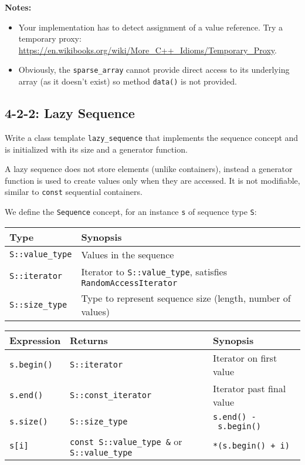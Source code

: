 \documentclass[]{article}
\providecommand{\tightlist}{%
  \setlength{\itemsep}{0pt}\setlength{\parskip}{0pt}}
\begin{document}
\textbf{Notes:}

\begin{itemize}
\tightlist
\item
  Your implementation has to detect assignment of a value reference. Try
  a temporary proxy:
  \url{https://en.wikibooks.org/wiki/More_C++_Idioms/Temporary_Proxy}.
\item
  Obviously, the \texttt{sparse\_array} cannot provide direct access to
  its underlying array (as it doesn't exist) so method \texttt{data()}
  is not provided.
\end{itemize}

\subsection{4-2-2: Lazy Sequence}\label{lazy-sequence}

Write a class template \texttt{lazy\_sequence} that implements the
sequence concept and is initialized with its size and a generator
function.

A lazy sequence does not store elements (unlike containers), instead a
generator function is used to create values only when they are accessed.
It is not modifiable, similar to \texttt{const} sequential containers.

We define the \texttt{Sequence} concept, for an instance \texttt{s} of
sequence type \texttt{S}:

\begin{longtable}[c]{@{}ll@{}}
\toprule
Type & Synopsis\tabularnewline
\midrule
\endhead
\texttt{S::value\_type} & Values in the sequence\tabularnewline
\texttt{S::iterator} & Iterator to \texttt{S::value\_type}, satisfies
\texttt{RandomAccessIterator}\tabularnewline
\texttt{S::size\_type} & Type to represent sequence size (length, number
of values)\tabularnewline
\bottomrule
\end{longtable}

\begin{longtable}[c]{@{}lll@{}}
\toprule
Expression & Returns & Synopsis\tabularnewline
\midrule
\endhead
\texttt{s.begin()} & \texttt{S::iterator} & Iterator on first
value\tabularnewline
\texttt{s.end()} & \texttt{S::const\_iterator} & Iterator past final
value\tabularnewline
\texttt{s.size()} & \texttt{S::size\_type} &
\texttt{s.end()\ -\ s.begin()}\tabularnewline
\texttt{s{[}i{]}} & \texttt{const\ S::value\_type\ \&} or
\texttt{S::value\_type} & \texttt{*(s.begin()\ +\ i)}\tabularnewline
\bottomrule
\end{longtable}
\end{document}
